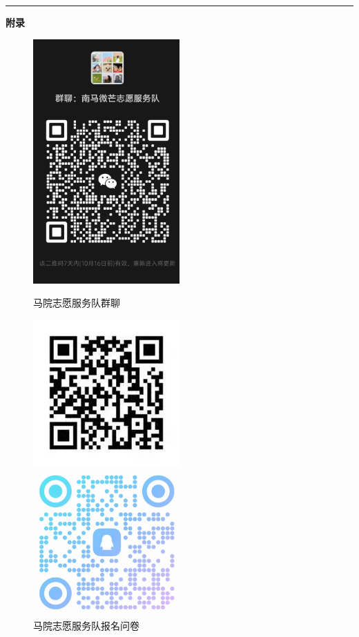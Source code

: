 \documentclass[letterpaper, 12pt]{article}
\begin{document}
\hrule
\vspace{4mm}
\centerline{\huge\textbf{附录}}
\begin{figure}[htbp]
    \centering
    \begin{minipage}[b]{0.32\textwidth}
        \centering
        \includegraphics[width=0.5\textwidth]{Group_Ma.png}
        \caption{马院志愿服务队群聊}
    \end{minipage}
    \begin{minipage}[b]{0.32\textwidth}
        \centering
        \includegraphics[width=0.5\textwidth]{Questionnare_Ma.png}
        \caption{马院志愿服务队报名问卷}
    \end{minipage}
    \begin{minipage}[b]{0.32\textwidth}
        \centering
        \includegraphics[width=0.5\textwidth]{Group_JC.png}

\end{minipage}
\end{figure}
\end{document}
